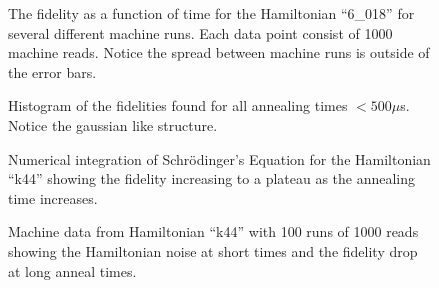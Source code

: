 \begin{figure}
	\caption[Short Time Fidelities]{The fidelity as a function of time for the Hamiltonian ``6\_018'' for several different machine runs.  Each data point consist of 1000 machine reads.  Notice the spread between machine runs is outside of the error bars.}
	\label{fig:short_fidelity}
\end{figure}

\begin{figure}
	\caption[Short Time Fidelity Histogram]{Histogram of the fidelities found for all annealing times  $< 500 \mu$s.  Notice the gaussian like structure.}
	\label{fig:fid_hist}
\end{figure}

\begin{figure}
	\caption[Simulation of Schr\"odinger's Equation]{Numerical integration of Schr\"odinger's Equation for the Hamiltonian ``k44'' showing the fidelity increasing to a plateau as the annealing time increases.}
	\label{fig:simulated_anneal}
\end{figure}

\begin{figure}
	\caption[Long Time Anneal]{Machine data from Hamiltonian ``k44'' with 100 runs of 1000 reads showing the Hamiltonian noise at short times and the fidelity drop at long anneal times.}
	\label{fig:k44_long}
\end{figure}
